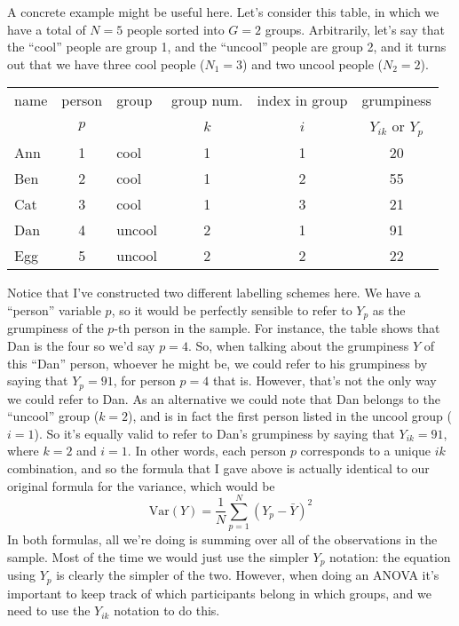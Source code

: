 A concrete example might be useful here. Let's consider this table, in which we have a total of $N=5$ people sorted into $G=2$ groups. Arbitrarily, let's say that the ``cool'' people are group 1, and the ``uncool'' people are group 2, and it turns out that we have three cool people ($N_1 = 3$) and two uncool people ($N_2 = 2$).
\begin{center}
\begin{tabular}{lclccc} \hline 
name & person & group & group num. & index in group & grumpiness \\
& $p$ &          & $k$ & $i$ & $Y_{ik}$ or $Y_p$ \\ \hline
Ann & 1 & cool   &  1  &  1  & 20 \\
Ben & 2 & cool   &  1  &  2  & 55\\
Cat & 3 & cool   &  1  &  3  & 21\\
Dan & 4 & uncool &  2  &  1  & 91\\
Egg & 5 & uncool &  2  &  2  & 22\\
\end{tabular}
\end{center}
Notice that I've constructed two different labelling schemes here. We have a ``person'' variable $p$, so it would be perfectly sensible to refer to $Y_p$ as the grumpiness of the $p$-th person in the sample. For instance, the table shows that Dan is the four so we'd say $p = 4$. So, when talking about the grumpiness $Y$ of this ``Dan'' person, whoever he might be, we could refer to his grumpiness by saying that $Y_p = 91$, for person $p = 4$ that is.  However, that's not the only way we could refer to Dan. As an alternative we could note that Dan belongs to the ``uncool'' group ($k = 2$), and is in fact the first person listed in the uncool group ($i = 1$). So it's equally valid to refer to Dan's grumpiness by saying that $Y_{ik} = 91$, where $k = 2$ and $i = 1$. In other words, each person $p$ corresponds to a unique $ik$ combination, and so the formula that I gave above is actually identical to our original formula for the variance, which would be
$$
\mbox{Var}(Y) = \frac{1}{N} \sum_{p=1}^N  \left(Y_{p} - \bar{Y} \right)^2
$$
In both formulas, all we're doing is summing over all of the observations in the sample. Most of the time we would just use the simpler $Y_p$ notation: the equation using $Y_p$ is clearly the simpler of the two. However, when doing an ANOVA it's important to keep track of which participants belong in which groups, and we need to use the $Y_{ik}$ notation to do this. 


